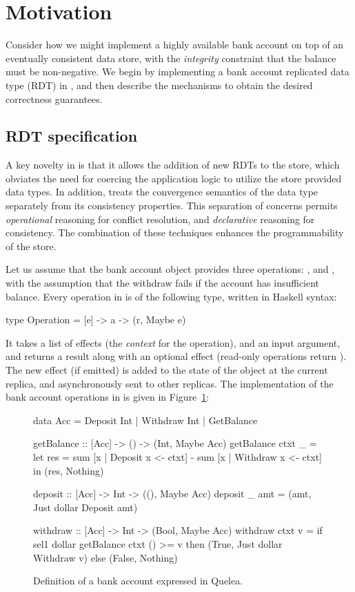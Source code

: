 \section{Motivation}
\label{sec:motivation}

Consider how we might implement a highly available bank account on top of an
eventually consistent data store, with the \emph{integrity} constraint that the
balance must be non-negative. We begin by implementing a bank account
replicated data type (RDT) in \name, and then describe the mechanisms to obtain
the desired correctness guarantees.

\subsection{RDT specification}

A key novelty in \name is that it allows the addition of new RDTs to the store,
which obviates the need for coercing the application logic to utilize the store
provided data types. In addition, \name treats the convergence semantics of the
data type separately from its consistency properties. This separation of
concerns permits \emph{operational} reasoning for conflict resolution, and
\emph{declarative} reasoning for consistency. The combination of these
techniques enhances the programmability of the store.

Let us assume that the bank account object provides three operations:
,  and , with the assumption that the
withdraw fails if the account has insufficient balance. Every operation in
\name is of the following type, written in Haskell syntax:

\begin{codehaskell}
type Operation = [e] -> a -> (r, Maybe e)
\end{codehaskell}

\noindent It takes a list of effects (the \emph{context} for the operation),
and an input argument, and returns a result along with an optional effect
(read-only operations return ). The new effect (if emitted) is
added to the state of the object at the current replica, and asynchronously
sent to other replicas. The implementation of the bank account operations in
\name is given in Figure~\ref{fig:ex}:

\begin{figure}
\begin{codehaskell}
data Acc = Deposit Int | Withdraw Int
				 | GetBalance

getBalance :: [Acc] -> () -> (Int, Maybe Acc)
getBalance ctxt _ =
  let res = sum [x | Deposit x <- ctxt]
						- sum [x | Withdraw x <- ctxt]
	in (res, Nothing)

deposit :: [Acc] -> Int -> ((), Maybe Acc)
deposit _ amt = (amt, Just dollar Deposit amt)

withdraw :: [Acc] -> Int -> (Bool, Maybe Acc)
withdraw ctxt v =
	if sel1 dollar getBalance ctxt () >= v
  then (True, Just dollar Withdraw v)
	else (False, Nothing)
\end{codehaskell}
\caption{Definition of a bank account expressed in Quelea.}
\label{fig:ex}
\end{figure}

